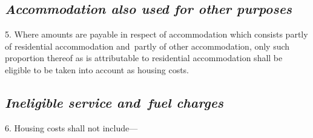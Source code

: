 \documentclass[12pt,a4paper]{article}
\begin{document}
\subsection*{\itshape Accommodation also used for other purposes}

5.  Where amounts are payable in respect of accommodation which consists partly of residential accommodation and~partly of other accommodation, only such proportion thereof as is attributable to residential accommodation shall be eligible to be taken into account as housing costs.

\subsection*{\itshape Ineligible service and~fuel charges}

6.  Housing costs shall not include—
\end{document}
